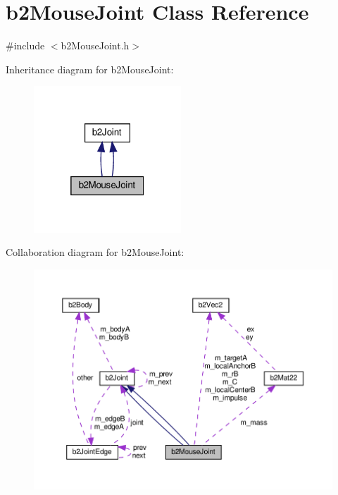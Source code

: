 \hypertarget{classb2MouseJoint}{}\section{b2\+Mouse\+Joint Class Reference}
\label{classb2MouseJoint}


{\ttfamily \#include $<$b2\+Mouse\+Joint.\+h$>$}



Inheritance diagram for b2\+Mouse\+Joint\+:
\nopagebreak
\begin{figure}[H]
\begin{center}
\leavevmode
\includegraphics[width=157pt]{classb2MouseJoint__inherit__graph}
\end{center}
\end{figure}


Collaboration diagram for b2\+Mouse\+Joint\+:
\nopagebreak
\begin{figure}[H]
\begin{center}
\leavevmode
\includegraphics[width=350pt]{classb2MouseJoint__coll__graph}
\end{center}
\end{figure}
